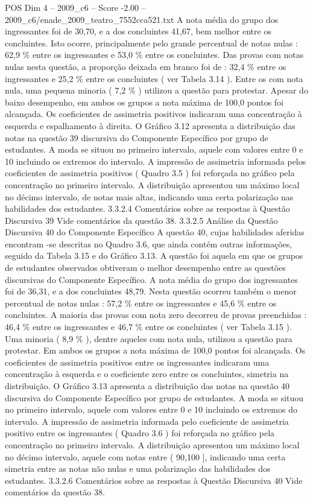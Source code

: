 \begin{textsample}{POS Dim 4 – 2009\_c6 – Score -2.00 – 2009\_c6/enade\_2009\_teatro\_7552cca521.txt}
A nota média do grupo dos ingressantes foi de 30,70, e a dos concluintes 41,67, bem melhor entre os concluintes.
Isto ocorre, principalmente pelo grande percentual de notas nulas : 62,9 \% entre os ingressantes e 53,0 \% entre os concluintes.
Das provas com notas nulas nesta questão, a proporção deixada em branco foi de : 32,4 \% entre os ingressantes e 25,2 \% entre os concluintes ( ver Tabela 3.14 ).
Entre os com nota nula, uma pequena minoria ( 7,2 \% ) utilizou a questão para protestar.
Apesar do baixo desempenho, em ambos os grupos a nota máxima de 100,0 pontos foi alcançada.
Os coeficientes de assimetria positivos indicaram uma concentração à esquerda e espalhamento à direita.
O Gráfico 3.12 apresenta a distribuição das notas na questão 39 discursiva do Componente Específico por grupo de estudantes.
A moda se situou no primeiro intervalo, aquele com valores entre 0 e 10 incluindo os extremos do intervalo.
A impressão de assimetria informada pelos coeficientes de assimetria positivos ( Quadro 3.5 ) foi reforçada no gráfico pela concentração no primeiro intervalo.
A distribuição apresentou um máximo local no décimo intervalo, de notas mais altas, indicando uma certa polarização nas habilidades dos estudantes. 3.3.2.4 Comentários sobre as respostas à Questão Discursiva 39 Vide comentários da questão 38. 3.3.2.5 Análise da Questão Discursiva 40 do Componente Específico A questão 40, cujas habilidades aferidas encontram -se descritas no Quadro 3.6, que ainda contém outras informações, seguido da Tabela 3.15 e do Gráfico 3.13.
A questão foi aquela em que os grupos de estudantes observados obtiveram o melhor desempenho entre as questões discursivas do Componente Específico.
A nota média do grupo dos ingressantes foi de 36,31, e a dos concluintes 48,79.
Nesta questão ocorreu também o menor percentual de notas nulas : 57,2 \% entre os ingressantes e 45,6 \% entre os concluintes.
A maioria das provas com nota zero decorreu de provas preenchidas : 46,4 \% entre os ingressantes e 46,7 \% entre os concluintes ( ver Tabela 3.15 ).
Uma minoria ( 8,9 \% ), dentre aqueles com nota nula, utilizou a questão para protestar.
Em ambos os grupos a nota máxima de 100,0 pontos foi alcançada.
Os coeficientes de assimetria positivos entre os ingressantes indicaram uma concentração à esquerda e o coeficiente zero entre os concluintes, simetria na distribuição.
O Gráfico 3.13 apresenta a distribuição das notas na questão 40 discursiva do Componente Específico por grupo de estudantes.
A moda se situou no primeiro intervalo, aquele com valores entre 0 e 10 incluindo os extremos do intervalo.
A impressão de assimetria informada pelo coeficiente de assimetria positivo entre os ingressantes ( Quadro 3.6 ) foi reforçada no gráfico pela concentração no primeiro intervalo.
A distribuição apresentou um máximo local no décimo intervalo, aquele com notas entre ( 90,100 ], indicando uma certa simetria entre as notas não nulas e uma polarização das habilidades dos estudantes. 3.3.2.6 Comentários sobre as respostas à Questão Discursiva 40 Vide comentários da questão 38.

\end{textsample}
